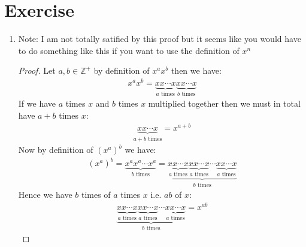 \documentclass{article}
\begin{document}
\section{Exercise}
\begin{enumerate}[label=(\alph*)]
    \item Note: I am not totally satified by this proof but it seems like you
    would have to do something like this if you want to use the definition of
    $x^n$
    
    \begin{proof}
        Let $a, b \in \mathbb{Z}^+$ by definition of $x^ax^b$ then we have:
        \begin{align*}
            x^ax^b = \underbrace{xx \cdots x}_{a\text{ times}}\underbrace{xx \cdots x}_{b\text{ times}}
        \end{align*}
        If we have $a$ times $x$ and $b$ times $x$ multiplied together then we
        must in total have $a + b$ times $x$:
        \begin{align*}
            \underbrace{xx \cdots x}_{a + b\text{ times}} = x^{a + b}
        \end{align*}
        Now by definition of $(x^a)^b$ we have:
        \begin{align*}
            (x^a)^b = \underbrace{x^ax^a \cdots x^a}_{b \text{ times}} = \underbrace{\underbrace{xx\cdots x}_{a \text{ times}} \underbrace{xx\cdots x}_{a \text{ times}} \cdots \underbrace{xx\cdots x}_{a \text{ times}}}_{b \text{ times}}
        \end{align*}
        Hence we have $b$ times of $a$ times $x$ i.e. $ab$ of $x$:
        \begin{align*}
            \underbrace{\underbrace{xx\cdots x}_{a \text{ times}} \underbrace{xx\cdots x}_{a \text{ times}} \cdots \underbrace{xx\cdots x}_{a \text{ times}}}_{b \text{ times}} = x^{ab}
        \end{align*} 
    \end{proof}
\end{enumerate}
\end{document}
